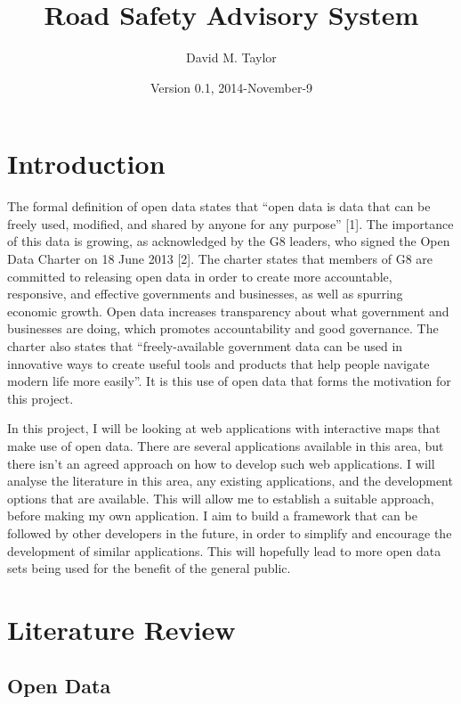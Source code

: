 \documentclass[authoryearcitations]{UoYCSproject}
\author{David M. Taylor}
\title{Road Safety Advisory System}
\date{Version 0.1, 2014-November-9}
\begin{document}
\maketitle
\listoffigures
\listoftables
\renewcommand*{\lstlistlistingname}{List of Listings}
\lstlistoflistings

\cleardoublepage
\label{sec:start}
\thispagestyle{empty}\cleardoublepage

\chapter{Introduction}
\label{cha:Introduction}

The formal definition of open data states that “open data is data that can be freely used, modified, and shared by anyone for any purpose” [1]. The importance of this data is growing, as acknowledged by the G8 leaders, who signed the Open Data Charter on 18 June 2013 [2]. The charter states that members of G8 are committed to releasing open data in order to create more accountable, responsive, and effective governments and businesses, as well as spurring economic growth. Open data increases transparency about what government and businesses are doing, which promotes accountability and good governance. The charter also states that “freely-available government data can be used in innovative ways to create useful tools and products that help people navigate modern life more easily”. It is this use of open data that forms the motivation for this project. 

In this project, I will be looking at web applications with interactive maps that make use of open data. There are several applications available in this area, but there isn't an agreed approach on how to develop such web applications. I will analyse the literature in this area, any existing applications, and the development options that are available. This will allow me to establish a suitable approach, before making my own application. I aim to build a framework that can be followed by other developers in the future, in order to simplify and encourage the development of similar applications. This will hopefully lead to more open data sets being used for the benefit of the general public.
\citep{KopkaDaly1999}

\chapter{Literature Review}
\section{Open Data}
\end{document}
